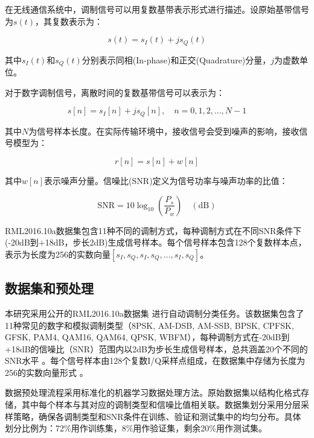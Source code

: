 \documentclass[conference]{IEEEtran}
\begin{document}
在无线通信系统中，调制信号可以用复数基带表示形式进行描述。设原始基带信号为$s(t)$，其复数表示为：

\begin{equation}
s(t) = s_I(t) + js_Q(t)
\end{equation}

其中$s_I(t)$和$s_Q(t)$分别表示同相(In-phase)和正交(Quadrature)分量，$j$为虚数单位。

对于数字调制信号，离散时间的复数基带信号可以表示为：

\begin{equation}
s[n] = s_I[n] + js_Q[n], \quad n = 0, 1, 2,..., N-1
\end{equation}

其中$N$为信号样本长度。在实际传输环境中，接收信号会受到噪声的影响，接收信号模型为：

\begin{equation}
r[n] = s[n] + w[n]
\end{equation}

其中$w[n]$表示噪声分量。信噪比(SNR)定义为信号功率与噪声功率的比值：

\begin{equation}
\mathrm{SNR} = 10\log_{10}\left(\frac{P_s}{P_w}\right) \quad(\mathrm{dB})
\end{equation}


RML2016.10a数据集包含11种不同的调制方式，每种调制方式在不同SNR条件下(-20dB到+18dB，步长2dB)生成信号样本。每个信号样本包含128个复数样本点，表示为长度为256的实数向量$[s_I, s_Q, s_I, s_Q,..., s_I, s_Q]$。

\subsection{数据集和预处理}

本研究采用公开的RML2016.10a数据集 \cite{oshea2016radio} 进行自动调制分类任务。该数据集包含了11种常见的数字和模拟调制类型（8PSK, AM-DSB, AM-SSB, BPSK, CPFSK, GFSK, PAM4, QAM16, QAM64, QPSK, WBFM），每种调制方式在-20dB到+18dB的信噪比（SNR）范围内以2dB为步长生成信号样本，总共涵盖20个不同的SNR水平 \cite{[1]}\cite{[2]}\cite{[3]}。每个信号样本由128个复数I/Q采样点组成，在数据集中存储为长度为256的实数向量形式 \cite{[1]}\cite{[34]}。

数据预处理流程采用标准化的机器学习数据处理方法。原始数据集以结构化格式存储，其中每个样本与其对应的调制类型和信噪比值相关联。数据集划分采用分层采样策略，确保各调制类型和SNR条件在训练、验证和测试集中的均匀分布。具体划分比例为：72\%用作训练集，8\%用作验证集，剩余20\%用作测试集。
\end{document}
